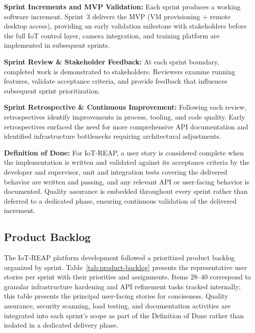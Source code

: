 \textbf{Sprint Increments and MVP Validation:} Each sprint produces a working software
increment. Sprint~3 delivers the MVP (VM provisioning + remote desktop access),
providing an early validation milestone with stakeholders before the full IoT control
layer, camera integration, and training platform are implemented in subsequent sprints.

\textbf{Sprint Review \& Stakeholder Feedback:} At each sprint boundary, completed
work is demonstrated to stakeholders. Reviewers examine running features, validate
acceptance criteria, and provide feedback that influences subsequent sprint
prioritization.

\textbf{Sprint Retrospective \& Continuous Improvement:} Following each review,
retrospectives identify improvements in process, tooling, and code quality. Early
retrospectives surfaced the need for more comprehensive API documentation and
identified infrastructure bottlenecks requiring architectural adjustments.

\textbf{Definition of Done:} For IoT-REAP, a user story is considered complete when
the implementation is written and validated against its acceptance criteria by the
developer and supervisor, unit and integration tests covering the delivered behavior
are written and passing, and any relevant API or user-facing behavior is documented.
Quality assurance is embedded throughout every sprint rather than deferred to a
dedicated phase, ensuring continuous validation of the delivered increment.

\subsection{Product Backlog}

The IoT-REAP platform development followed a prioritized product backlog organized by
sprint. Table~\ref{tab:product-backlog} presents the representative user stories per
sprint with their priorities and assignments. Items 28--40 correspond to granular
infrastructure hardening and API refinement tasks tracked internally; this table
presents the principal user-facing stories for conciseness. Quality assurance,
security scanning, load testing, and documentation activities are integrated into
each sprint's scope as part of the Definition of Done rather than isolated in a
dedicated delivery phase.

